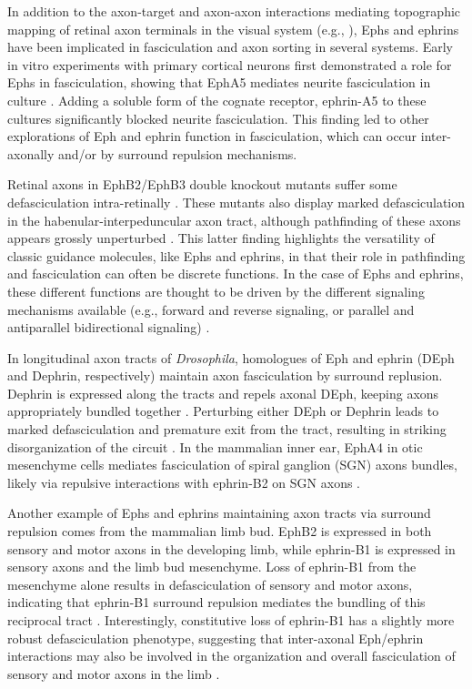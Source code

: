 \label{sec:EphFascic}
In addition to the axon-target and axon-axon interactions mediating topographic mapping of retinal axon terminals in the visual system (e.g., ), Ephs and ephrins have been implicated in fasciculation and axon sorting in several systems.
Early in vitro experiments with primary cortical neurons first demonstrated a role for Ephs in fasciculation, showing that EphA5 mediates neurite fasciculation in culture \cite{winslow1995cloning}.
Adding a soluble form of the cognate receptor, ephrin-A5 to these cultures significantly blocked neurite fasciculation.
This finding led to other explorations of Eph and ephrin function in fasciculation, which can occur inter-axonally and/or by surround repulsion mechanisms.

Retinal axons in EphB2/EphB3 double knockout mutants suffer some defasciculation intra-retinally \cite{birgbauer2000kinase}.
These mutants also display marked defasciculation in the habenular-interpeduncular axon tract, although pathfinding of these axons appears grossly unperturbed \cite{orioli1996sek4}.
This latter finding highlights the versatility of classic guidance molecules, like Ephs and ephrins, in that their role in pathfinding and fasciculation can often be discrete functions.
In the case of Ephs and ephrins, these different functions are thought to be driven by the different signaling mechanisms available (e.g., forward and reverse signaling, or parallel and antiparallel bidirectional signaling) \cite{kania2016mechanisms,egea2007bidirectional,klein2014ephrin}.

In longitudinal axon tracts of \emph{Drosophila}, homologues of Eph and ephrin (DEph and Dephrin, respectively) maintain axon fasciculation by surround replusion.
Dephrin is expressed along the tracts and repels axonal DEph, keeping axons appropriately bundled together \cite{bossing2002dephrin}.
Perturbing either DEph or Dephrin leads to marked defasciculation and premature exit from the tract, resulting in striking disorganization of the circuit \cite{bossing2002dephrin}.
In the mammalian inner ear, EphA4 in otic mesenchyme cells mediates fasciculation of spiral ganglion (SGN) axons bundles, likely via repulsive interactions with ephrin-B2 on SGN axons \cite{coate2012otic}.

Another example of Ephs and ephrins maintaining axon tracts via surround repulsion comes from the mammalian limb bud.
EphB2 is expressed in both sensory and motor axons in the developing limb, while ephrin-B1 is expressed in sensory axons and the limb bud mesenchyme.
Loss of ephrin-B1 from the mesenchyme alone results in defasciculation of sensory and motor axons, indicating that ephrin-B1 surround repulsion mediates the bundling of this reciprocal tract \cite{luxey2013eph}.
Interestingly, constitutive loss of ephrin-B1 has a slightly more robust defasciculation phenotype, suggesting that inter-axonal Eph/ephrin interactions may also be involved in the organization and overall fasciculation of sensory and motor axons in the limb \cite{luxey2013eph}.


